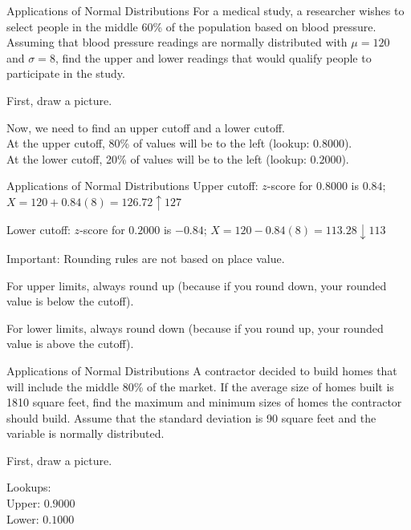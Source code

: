 \documentclass[t, aspectratio=169]{beamer}
\newcommand{\?}{\stackrel{?}{=}}
\begin{document}
	\begin{frame}{Applications of Normal Distributions}
		For a medical study, a researcher wishes to select people in the middle 60\% of the population based on blood pressure. Assuming that blood pressure readings are normally distributed with $\mu = 120$ and $\sigma = 8$, find the upper and lower readings that would qualify people to participate in the study. \pause
		
		First, draw a picture. \pause \vspace{1in}
		
		Now, we need to find an upper cutoff and a lower cutoff. \pause \\
		At the upper cutoff, 80\% of values will be to the left (lookup: $0.8000$). \pause \\
		At the lower cutoff, 20\% of values will be to the left (lookup: $0.2000$).
	\end{frame}

	\begin{frame}{Applications of Normal Distributions}
		Upper cutoff: $z$-score for $0.8000$ is $0.84$; $X = 120 + 0.84(8) = 126.72 \uparrow 127$ \pause
		
		Lower cutoff: $z$-score for $0.2000$ is $-0.84$; $X = 120 - 0.84(8) = 113.28 \downarrow 113$ \pause
		
		Important: Rounding rules are not based on place value. \pause
		
		For upper limits, always round up (because if you round down, your rounded value is below the cutoff). \pause
		
		For lower limits, always round down (because if you round up, your rounded value is above the cutoff).
	\end{frame}

	\begin{frame}{Applications of Normal Distributions}
		A contractor decided to build homes that will include the middle 80\% of the market. If the average size of homes built is 1810 square feet, find the maximum and minimum sizes of homes the contractor should build. Assume that the standard deviation is 90 square feet and the variable is normally distributed. \pause
		
		First, draw a picture. \pause \vspace{1in}
		
		Lookups: \\ \pause
		Upper: $0.9000$ \\ \pause
		Lower: $0.1000$
	\end{frame}
\end{document}
